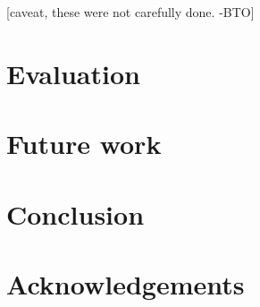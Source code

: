 \documentclass[11pt]{article}
\newcommand{\bocomment}[1]{\textcolor{Bittersweet}{[#1 -BTO]}}
\begin{document}
\bocomment{caveat, these were not carefully done.}


\section{Evaluation}

\section{Future work}

\section{Conclusion}

\nocite{flanigan-etal:ACL2014}



\section*{Acknowledgements}



\end{document}
